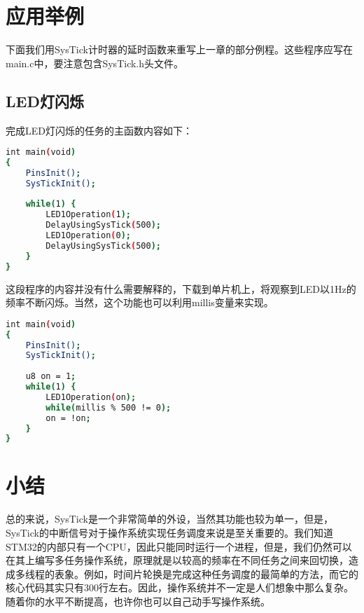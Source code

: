 \section{应用举例}
	下面我们用SysTick计时器的延时函数来重写上一章的部分例程。这些程序应写在main.c中，要注意包含SysTick.h头文件。
	\subsection{LED灯闪烁}
	完成LED灯闪烁的任务的主函数内容如下：
	\par 
	\begin{lstlisting}[language=bash, style=customStyleC, caption=LED闪烁]
int main(void)
{
	PinsInit();
	SysTickInit();
	
	while(1) {
		LED1Operation(1);
		DelayUsingSysTick(500);
		LED1Operation(0);
		DelayUsingSysTick(500);
	}
}
	\end{lstlisting}
	\par 
	这段程序的内容并没有什么需要解释的，下载到单片机上，将观察到LED以1Hz的频率不断闪烁。当然，这个功能也可以利用millis变量来实现。
	\par 
	\begin{lstlisting}[language=bash, style=customStyleC, caption=用millis实现LED闪烁]
int main(void)
{
	PinsInit();
	SysTickInit();
	
	u8 on = 1;
	while(1) {
		LED1Operation(on);
		while(millis % 500 != 0);
		on = !on;
	}
}
	\end{lstlisting}
	\par 

\section{小结}
总的来说，SysTick是一个非常简单的外设，当然其功能也较为单一，但是，SysTick的中断信号对于操作系统实现任务调度来说是至关重要的。我们知道STM32的内部只有一个CPU，因此只能同时运行一个进程，但是，我们仍然可以在其上编写多任务操作系统，原理就是以较高的频率在不同任务之间来回切换，造成多线程的表象。例如，时间片轮换是完成这种任务调度的最简单的方法，而它的核心代码其实只有300行左右。因此，操作系统并不一定是人们想象中那么复杂。随着你的水平不断提高，也许你也可以自己动手写操作系统。

